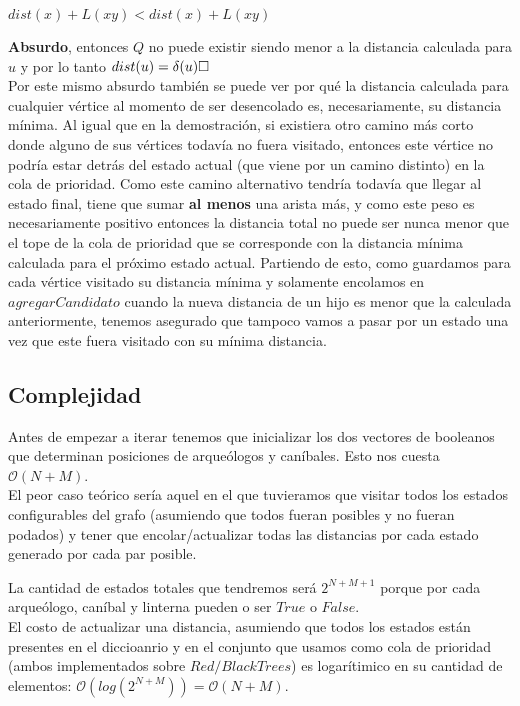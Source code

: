 \begin{center}
$dist(x)+L(xy) < dist(x) + L(xy)$
\\
\end{center}
\textbf{Absurdo}, entonces $Q$ no puede existir siendo menor a la distancia calculada para $u$ y por lo tanto $dist(u) = \delta(u) \QEDB$
\\

Por este mismo absurdo también se puede ver por qué la distancia calculada para cualquier vértice al momento de ser desencolado es, necesariamente, su distancia mínima. Al igual que en la demostración, si existiera otro camino más corto donde alguno de sus vértices todavía no fuera visitado, entonces este vértice no podría estar detrás del estado actual (que viene por un camino distinto) en la cola de prioridad. Como este camino alternativo tendría todavía que llegar al estado final, tiene que sumar \textbf{al menos} una arista más, y como este peso es necesariamente positivo entonces la distancia total no puede ser nunca menor que el tope de la cola de prioridad que se corresponde con la distancia mínima calculada para el próximo estado actual. Partiendo de esto, como guardamos para cada vértice visitado su distancia mínima y solamente encolamos en $agregarCandidato$ cuando la nueva distancia de un hijo es menor que la calculada anteriormente, tenemos asegurado que tampoco vamos a pasar por un estado una vez que este fuera visitado con su mínima distancia.

\subsection{Complejidad}
Antes de empezar a iterar tenemos que inicializar los dos vectores de booleanos que determinan posiciones de arqueólogos y caníbales. Esto nos cuesta $\mathcal{O}(N+M)$. \\

El peor caso teórico sería aquel en el que tuvieramos que visitar todos los estados configurables del grafo (asumiendo que todos fueran posibles y no fueran podados) y tener que encolar/actualizar todas las distancias por cada estado generado por cada par posible.

La cantidad de estados totales que tendremos será $2^{N+M+1}$ porque por cada arqueólogo, caníbal y linterna pueden o ser $True$ o $False$. \\

El costo de actualizar una distancia, asumiendo que todos los estados están presentes en el diccioanrio y en el conjunto que usamos como cola de prioridad (ambos implementados sobre $Red/Black Trees$) es logarítimico en su cantidad de elementos: $\mathcal{O}(log(2^{N+M})) = \mathcal{O}(N+M)$. \\


